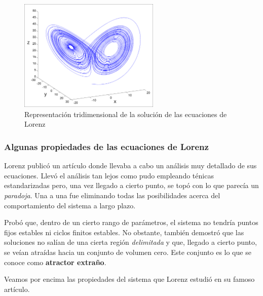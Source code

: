 \begin{figure}[hbtp]
\centering
\includegraphics[width = 0.6\textwidth]{img/Lorenz.png}
\caption{Representación tridimensional de la solución de las ecuaciones de Lorenz}
\label{fig:Lorenz}
\end{figure}

\subsubsection{Algunas propiedades de las ecuaciones de Lorenz}
Lorenz publicó un artículo donde llevaba a cabo un análisis muy detallado de sus ecuaciones. Llevó el análisis tan lejos como pudo empleando ténicas estandarizadas pero, una vez llegado a cierto punto, se topó con lo que parecía un \emph{paradoja}. Una a una fue eliminando todas las posibilidades acerca del comportamiento del sistema a largo plazo.

Probó que, dentro de un cierto rango de parámetros, el sistema no tendría puntos fijos estables ni ciclos finitos estables. No obstante, también demostró que las soluciones no salían de una cierta región \emph{delimitada} y que, llegado a cierto punto, se veían atraídas hacia un conjunto de volumen cero. Este conjunto es lo que se conoce como \textbf{atractor extraño}.

Veamos por encima las propiedades del sistema que Lorenz estudió en su famoso artículo.

